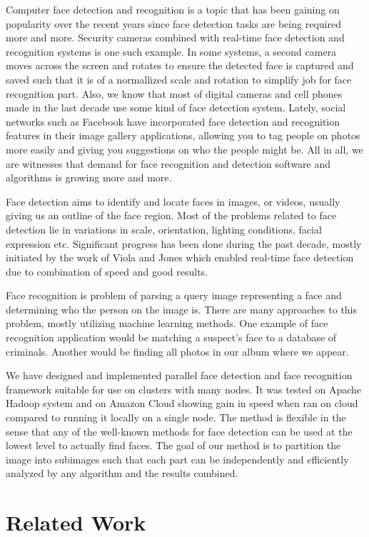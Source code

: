 \documentclass[11pt, draftclsnofoot, onecolumn]{IEEEtran}
\begin{document}
Computer face detection and recognition is a topic that has been gaining on popularity over the recent years since face detection tasks are being required more and more. Security cameras combined with real-time face detection and recognition systems is one such example. In some systems, a second camera moves across the screen and rotates to ensure the detected face is captured and saved such that it is of a normallized scale and rotation to simplify job for face recognition part. Also, we know that most of digital cameras and cell phones made in the last decade use some kind of face detection system. Lately, social networks such as Facebook have incorporated face detection and recognition features in their image gallery applications, allowing you to tag people on photos more easily and giving you suggestions on who the people might be. All in all, we are witnesses that demand for face recognition and detection software and algorithms is growing more and more.

Face detection aims to identify and locate faces in images, or videos, usually giving us an outline of the face region. Most of the problems related to face detection lie in variations in scale, orientation, lighting conditions, facial expression etc. Significant progress has been done during the past decade, mostly initiated by the work of Viola and Jones \cite{IWSCTV2001} which enabled real-time face detection due to combination of speed and good results.

Face recognition is problem of parsing a query image representing a face and determining who the person on the image is. There are many approaches to this problem, mostly utilizing machine learning methods. One example of face recognition application would be matching a suspect's face to a database of criminals. Another would be finding all photos in our album where we appear.

We have designed and implemented parallel face detection and face recognition framework suitable for use on clusters with many nodes. It was tested on Apache Hadoop system and on Amazon Cloud showing gain in speed when ran on cloud compared to running it locally on a single node. The method is flexible in the sense that any of the well-known methods for face detection can be used at the lowest level to actually find faces. The goal of our method is to partition the image into subimages such that each part can be independently and efficiently analyzed by any algorithm and the results combined.

\section{Related Work} \label{sec:related}
\end{document}
